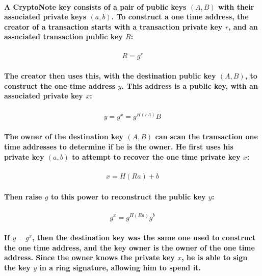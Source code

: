 \documentclass{article}
\begin{document}
\paragraph{A CryptoNote key consists of a pair of public keys $(A, B)$ with their associated private keys $(a, b)$.  To construct a one time address, the creator of a transaction starts with a transaction private key $r$, and an associated transaction public key $R$:}

\begin{eqnarray}
  R=g^r
\end{eqnarray}

\paragraph{The creator then uses this, with the destination public key $(A, B)$, to construct the one time address $y$.  This address is a public key, with an associated private key $x$:}

\begin{eqnarray}
  y = g^x = g^{H(rA)} B
\end{eqnarray}

\paragraph{The owner of the destination key $(A, B)$ can scan the transaction one time addresses to determine if he is the owner.  He first uses his private key $(a, b)$ to attempt to recover the one time private key $x$:}

\begin{eqnarray}
	x = H(Ra) + b
\end{eqnarray}

\paragraph{Then raise $g$ to this power to reconstruct the public key $y$:}

\begin{eqnarray}
  g^x = g^{H(Ra)} g^b
\end{eqnarray}

\paragraph{If $y = g^x$, then the destination key was the same one used to construct the one time address, and the key owner is the owner of the one time address.  Since the owner knows the private key $x$, he is able to sign the key $y$ in a ring signature, allowing him to spend it.}
\end{document}
